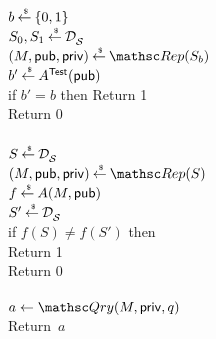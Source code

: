 \begin{figure}[htbp]
\centering
{}
%
{
{
\\
$b \getsr \bits$\\
$S_0,S_1 \getsr \distr{\calS}{}$\\
$(M,\pubaux,\privaux) \getsr \Rep(S_b)$\\
$b' \getsr A^{\TestOracle}(\pubaux)$\\
if $b' = b$ then Return 1\\
Return 0\\

\medskip
{}\\
$S \getsr \distr{\calS}{}$\\
$(M,\pubaux,\privaux) \getsr \Rep(S)$\\
$f \getsr A(M,\pubaux)$\\
$S' \getsr \distr{\calS}{}$\\
if $f(S) \neq f(S')$ then\\
\nudge Return 1\\
Return 0\\
}
%
{
\\
$a \gets \Qry(M,\privaux,q)$\\
Return~$a$\\


}}
\end{figure}
